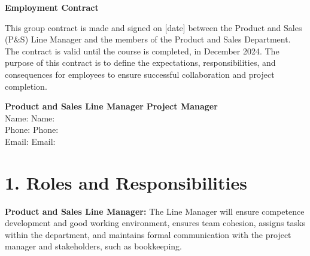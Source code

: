 \documentclass[a4paper,12pt]{article}
\begin{document}
\thispagestyle{firstpage}

\vspace*{3cm} %

\begin{center}
    \textbf{\LARGE Employment Contract}
\end{center}

\vspace{1em}
This group contract is made and signed on \underline{\hspace{3cm}} [date] between the Product and Sales (P\&S) Line Manager and the members of the Product and Sales Department. The contract is valid until the course is completed, in December 2024. The purpose of this contract is to define the expectations, responsibilities, and consequences for employees to ensure successful collaboration and project completion.

\vspace{1em}

\noindent\textbf{Product and Sales Line Manager} \hfill 
\textbf{Project Manager} \\

\noindent Name: \underline{} \hfill Name: \underline{\makebox[6cm]{}} \\
Phone: \underline{} \hfill Phone: \underline{} \\
Email: \underline{} \hfill Email: \underline{} 


\vspace{2em}

\section*{1. Roles and Responsibilities}
\vspace{0.5em} 

\textbf{Product and Sales Line Manager:} 
The Line Manager will ensure competence development and good working environment, ensures team cohesion, assigns tasks within the department, and maintains formal communication with the project manager and stakeholders, such as bookkeeping. 
\end{document}
